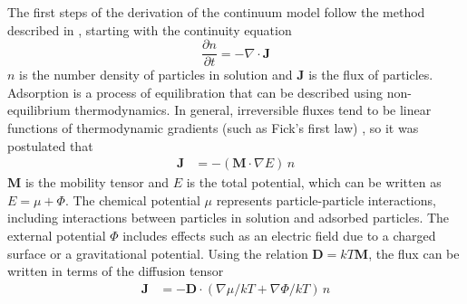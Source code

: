 The first steps of the derivation of the continuum model follow the
method described in \cite{Adamczyk1999a,Adamczyk2000,Adamczyk1999},
starting with the continuity equation\begin{equation}
\frac{\partial n}{\partial t}=-\nabla\cdot\mathbf{J}\label{eq:Continuity}\end{equation}
$n$ is the number density of particles in solution and $\mathbf{J}$
is the flux of particles. Adsorption is a process of equilibration
that can be described using non-equilibrium thermodynamics. In general,
irreversible fluxes tend to be linear functions of thermodynamic gradients
(such as Fick's first law) \cite{degroot1984non}, so it was postulated
that \begin{align}
\mathbf{J} & =-\left(\mathbf{M}\cdot\nabla E\right)\, n\label{eq:Flux ito Mobility}\end{align}
$\mathbf{M}$ is the mobility tensor and $E$ is the total potential,
which can be written as $E=\mu+\Phi$. The chemical potential $\mu$
represents particle-particle interactions, including interactions
between particles in solution and adsorbed particles. The external
potential $\Phi$ includes effects such as an electric field due to
a charged surface or a gravitational potential. Using the relation
$\mathbf{D}=kT\mathbf{M}$, the flux can be written in terms of the
diffusion tensor\begin{align}
\mathbf{J} & =-\mathbf{D}\cdot\left(\nabla\mu/kT+\nabla\Phi/kT\right)\, n\label{eq:Flux ito Diffusion}\end{align}


